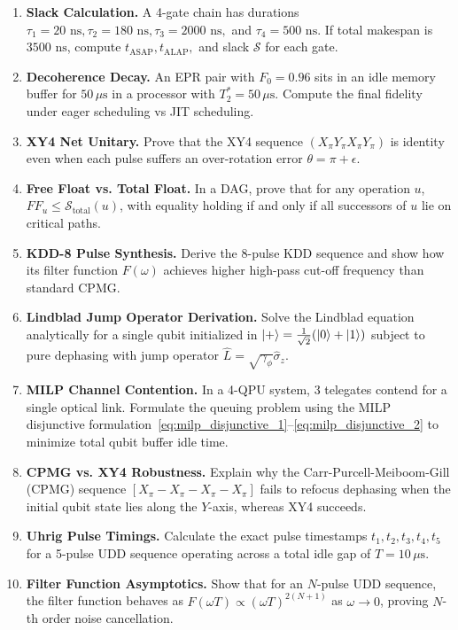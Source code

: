 \begin{enumerate}[label=\textbf{9.\arabic*.}]
    \item \textbf{Slack Calculation.} A 4-gate chain has durations $\tau_1 = 20\text{ ns}, \tau_2 = 180\text{ ns}, \tau_3 = 2000\text{ ns},$ and $\tau_4 = 500\text{ ns}$. If total makespan is $3500\text{ ns}$, compute $t_{\text{ASAP}}, t_{\text{ALAP}},$ and slack $\mathcal{S}$ for each gate.
    \item \textbf{Decoherence Decay.} An EPR pair with $F_0 = 0.96$ sits in an idle memory buffer for $50\,\mu\text{s}$ in a processor with $T_2^* = 50\,\mu\text{s}$. Compute the final fidelity under eager scheduling vs JIT scheduling.
    \item \textbf{XY4 Net Unitary.} Prove that the XY4 sequence $(X_\pi Y_\pi X_\pi Y_\pi)$ is identity even when each pulse suffers an over-rotation error $\theta = \pi + \epsilon$.
    \item \textbf{Free Float vs. Total Float.} In a DAG, prove that for any operation $u$, $FF_u \le \mathcal{S}_{\text{total}}(u)$, with equality holding if and only if all successors of $u$ lie on critical paths.
    \item \textbf{KDD-8 Pulse Synthesis.} Derive the 8-pulse KDD sequence and show how its filter function $F(\omega)$ achieves higher high-pass cut-off frequency than standard CPMG.
    \item \textbf{Lindblad Jump Operator Derivation.} Solve the Lindblad equation analytically for a single qubit initialized in $\ket{+} = \frac{1}{\sqrt{2}}(\ket{0}+\ket{1})$ subject to pure dephasing with jump operator $\hat{L} = \sqrt{\gamma_\phi} \hat{\sigma}_z$.
    \item \textbf{MILP Channel Contention.} In a 4-QPU system, 3 telegates contend for a single optical link. Formulate the queuing problem using the MILP disjunctive formulation~\eqref{eq:milp_disjunctive_1}--\eqref{eq:milp_disjunctive_2} to minimize total qubit buffer idle time.
    \item \textbf{CPMG vs. XY4 Robustness.} Explain why the Carr-Purcell-Meiboom-Gill (CPMG) sequence $[X_\pi - X_\pi - X_\pi - X_\pi]$ fails to refocus dephasing when the initial qubit state lies along the $Y$-axis, whereas XY4 succeeds.
    \item \textbf{Uhrig Pulse Timings.} Calculate the exact pulse timestamps $t_1, t_2, t_3, t_4, t_5$ for a 5-pulse UDD sequence operating across a total idle gap of $T = 10\,\mu\text{s}$.
    \item \textbf{Filter Function Asymptotics.} Show that for an $N$-pulse UDD sequence, the filter function behaves as $F(\omega T) \propto (\omega T)^{2(N+1)}$ as $\omega \to 0$, proving $N$-th order noise cancellation.
\end{enumerate}
